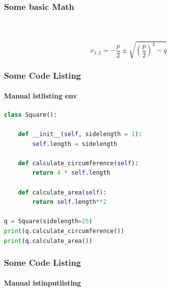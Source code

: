 \begin{frame}
\frametitle{Some basic Math}
\framesubtitle{~}

\begin{equation}
x_{1,2} = - \frac{p}{2} \pm 
\sqrt{ 
	\left( 
		\frac{p}{2} 
	\right)^2 
	- q}
\end{equation}

\end{frame}


\begin{frame}[fragile]
\frametitle{Some Code Listing}
\framesubtitle{Manual lstlisting env}

\begin{lstlisting}[language={Python}, caption={A square class in Python}, label={lis:square}]
class Square():

    def __init__(self, sidelength = 1):
        self.length = sidelength
        
    def calculate_circumference(self):
        return 4 * self.length
        
    def calculate_area(self):
        return self.length**2

q = Square(sidelength=25)
print(q.calculate_circumference())
print(q.calculate_area())
\end{lstlisting}

\end{frame}



\begin{frame}[fragile]
\frametitle{Some Code Listing}
\framesubtitle{Manual lstinputlisting}



\end{frame}



